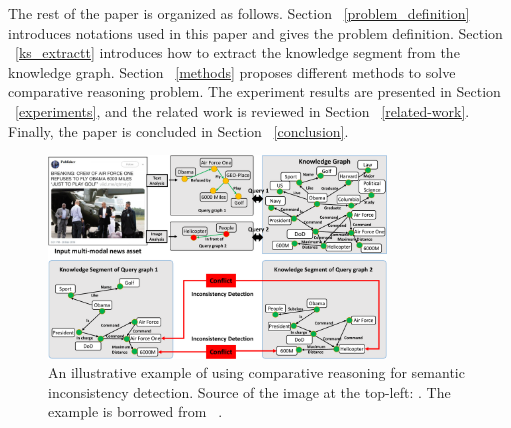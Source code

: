 The rest of the paper is organized as follows. Section ~\ref{problem_definition} introduces notations used in this paper and gives the problem definition.
Section ~\ref{ks_extractt} introduces how to extract the knowledge segment from the knowledge graph.
Section ~\ref{methods} proposes different methods to solve comparative reasoning problem.
The experiment results are presented in Section ~\ref{experiments}, and the related work is reviewed in Section ~\ref{related-work}. Finally, the paper is concluded in Section ~\ref{conclusion}.

\begin{figure}[ht!]
\centering
\includegraphics[width=0.8\textwidth]{submissions/logical-queries-uiuc/img/pdfresizer.pdf}
\caption{An illustrative example of using comparative reasoning for semantic inconsistency detection. Source of the image at the top-left: \cite{Cui2019SAMES}. The example is borrowed from ~\cite{kompare}.
}
\label{inconsistency}
\end{figure}
